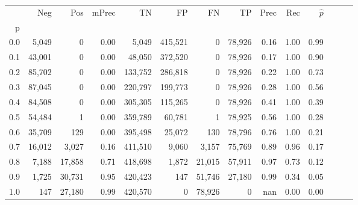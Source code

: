 \begin{tabular}{rrrrrrrrrrrrrr}
\toprule
{} &     Neg &     Pos & mPrec &       TN &       FP &      FN &      TP &  Prec &   Rec & $\hat{p}$ \\
p   &         &         &       &          &          &         &         &       &       &           \\
\midrule
0.0 &   5,049 &       0 &  0.00 &    5,049 &  415,521 &       0 &  78,926 &  0.16 &  1.00 &      0.99 \\
0.1 &  43,001 &       0 &  0.00 &   48,050 &  372,520 &       0 &  78,926 &  0.17 &  1.00 &      0.90 \\
0.2 &  85,702 &       0 &  0.00 &  133,752 &  286,818 &       0 &  78,926 &  0.22 &  1.00 &      0.73 \\
0.3 &  87,045 &       0 &  0.00 &  220,797 &  199,773 &       0 &  78,926 &  0.28 &  1.00 &      0.56 \\
0.4 &  84,508 &       0 &  0.00 &  305,305 &  115,265 &       0 &  78,926 &  0.41 &  1.00 &      0.39 \\
0.5 &  54,484 &       1 &  0.00 &  359,789 &   60,781 &       1 &  78,925 &  0.56 &  1.00 &      0.28 \\
0.6 &  35,709 &     129 &  0.00 &  395,498 &   25,072 &     130 &  78,796 &  0.76 &  1.00 &      0.21 \\
0.7 &  16,012 &   3,027 &  0.16 &  411,510 &    9,060 &   3,157 &  75,769 &  0.89 &  0.96 &      0.17 \\
0.8 &   7,188 &  17,858 &  0.71 &  418,698 &    1,872 &  21,015 &  57,911 &  0.97 &  0.73 &      0.12 \\
0.9 &   1,725 &  30,731 &  0.95 &  420,423 &      147 &  51,746 &  27,180 &  0.99 &  0.34 &      0.05 \\
1.0 &     147 &  27,180 &  0.99 &  420,570 &        0 &  78,926 &       0 &   nan &  0.00 &      0.00 \\
\bottomrule
\end{tabular}
